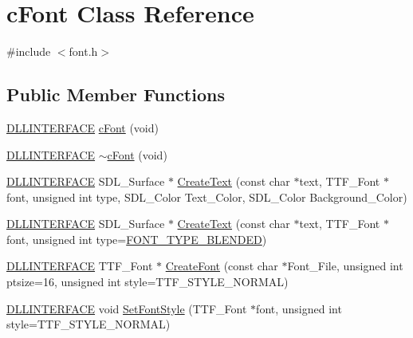 \hypertarget{classc_font}{\section{c\-Font Class Reference}
\label{classc_font}
}


{\ttfamily \#include $<$font.\-h$>$}

\subsection*{Public Member Functions}
\begin{DoxyCompactItemize}
\item 
\hyperlink{_s_d_l__ep_8h_a38dd54df4631b4daf553096353d7b20b}{D\-L\-L\-I\-N\-T\-E\-R\-F\-A\-C\-E} \hyperlink{classc_font_a1a5a3a11895ce275f9e99ae42332c9ff}{c\-Font} (void)
\item 
\hyperlink{_s_d_l__ep_8h_a38dd54df4631b4daf553096353d7b20b}{D\-L\-L\-I\-N\-T\-E\-R\-F\-A\-C\-E} \hyperlink{classc_font_ae41e275d0183d2e98bacf05145016896}{$\sim$c\-Font} (void)
\item 
\hyperlink{_s_d_l__ep_8h_a38dd54df4631b4daf553096353d7b20b}{D\-L\-L\-I\-N\-T\-E\-R\-F\-A\-C\-E} S\-D\-L\-\_\-\-Surface $\ast$ \hyperlink{classc_font_a5e7d87da787e072678abee523d01e724}{Create\-Text} (const char $\ast$text, T\-T\-F\-\_\-\-Font $\ast$font, unsigned int type, S\-D\-L\-\_\-\-Color Text\-\_\-\-Color, S\-D\-L\-\_\-\-Color Background\-\_\-\-Color)
\item 
\hyperlink{_s_d_l__ep_8h_a38dd54df4631b4daf553096353d7b20b}{D\-L\-L\-I\-N\-T\-E\-R\-F\-A\-C\-E} S\-D\-L\-\_\-\-Surface $\ast$ \hyperlink{classc_font_abc384e47f0d5ef956eae943826de2db3}{Create\-Text} (const char $\ast$text, T\-T\-F\-\_\-\-Font $\ast$font, unsigned int type=\hyperlink{font_8h_a5aa7982ced52c0b419fabbb9fb6a080d}{F\-O\-N\-T\-\_\-\-T\-Y\-P\-E\-\_\-\-B\-L\-E\-N\-D\-E\-D})
\item 
\hyperlink{_s_d_l__ep_8h_a38dd54df4631b4daf553096353d7b20b}{D\-L\-L\-I\-N\-T\-E\-R\-F\-A\-C\-E} T\-T\-F\-\_\-\-Font $\ast$ \hyperlink{classc_font_a9cda61e758210967fdad70e9a42bf858}{Create\-Font} (const char $\ast$Font\-\_\-\-File, unsigned int ptsize=16, unsigned int style=T\-T\-F\-\_\-\-S\-T\-Y\-L\-E\-\_\-\-N\-O\-R\-M\-A\-L)
\item 
\hyperlink{_s_d_l__ep_8h_a38dd54df4631b4daf553096353d7b20b}{D\-L\-L\-I\-N\-T\-E\-R\-F\-A\-C\-E} void \hyperlink{classc_font_a05f5e81edc2bafa2dd0a756468e62cb9}{Set\-Font\-Style} (T\-T\-F\-\_\-\-Font $\ast$font, unsigned int style=T\-T\-F\-\_\-\-S\-T\-Y\-L\-E\-\_\-\-N\-O\-R\-M\-A\-L)
\end{DoxyCompactItemize}
